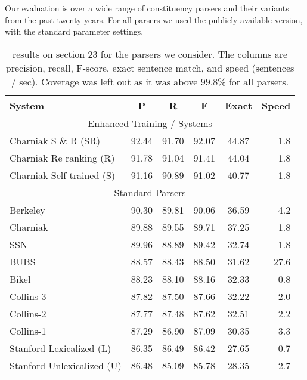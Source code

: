 Our evaluation is over a wide range of \ptb constituency parsers and their variants from the past twenty years.
For all parsers we used the publicly available version, with the standard parameter settings.

\begin{table}
\begin{center}
\begin{tabular}{|lccccr|}
	\hline
		System & P & R & F & Exact & Speed \\
	\hline
	\hline
		\multicolumn{6}{|c|}{Enhanced Training / Systems} \\
		Charniak S \& R (SR)       & 92.44 & 91.70 & 92.07 & 44.87 & 1.8 \\
		Charniak Re ranking (R)     & 91.78 & 91.04 & 91.41 & 44.04 & 1.8 \\
		Charniak Self-trained (S)  & 91.16 & 90.89 & 91.02 & 40.77 & 1.8 \\
	\hline
		\multicolumn{6}{|c|}{Standard Parsers} \\
		Berkeley                   & 90.30 & 89.81 & 90.06 & 36.59 & 4.2 \\
		Charniak                   & 89.88 & 89.55 & 89.71 & 37.25 & 1.8 \\
		SSN                        & 89.96 & 88.89 & 89.42 & 32.74 & 1.8 \\
		BUBS                       & 88.57 & 88.43 & 88.50 & 31.62 & 27.6 \\
		Bikel                      & 88.23 & 88.10 & 88.16 & 32.33 & 0.8 \\
		Collins-3                  & 87.82 & 87.50 & 87.66 & 32.22 & 2.0 \\
		Collins-2                  & 87.77 & 87.48 & 87.62 & 32.51 & 2.2 \\
		Collins-1                  & 87.29 & 86.90 & 87.09 & 30.35 & 3.3 \\
		Stanford Lexicalized (L)   & 86.35 & 86.49 & 86.42 & 27.65 & 0.7 \\
		Stanford Unlexicalized (U) & 86.48 & 85.09 & 85.78 & 28.35 & 2.7 \\
	\hline
\end{tabular}
\caption[\parseval results on \wsj section 23 for the parsers we consider.]{ \label{tab:standard-results} 
	\parseval results on \wsj section 23 for the parsers we consider.
  The columns are precision, recall, F-score, exact sentence match, and speed (sentences / sec).
  Coverage was left out as it was above 99.8\% for all parsers.
}
\end{center}
\end{table}

